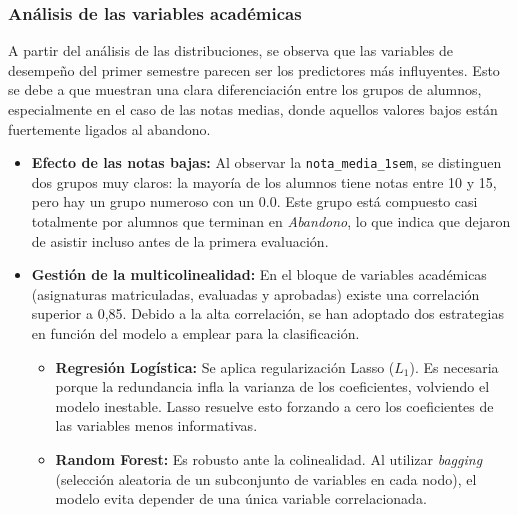\documentclass{article}
\begin{document}
\subsubsection{Análisis de las variables académicas}
A partir del análisis de las distribuciones, se observa que las variables de desempeño del primer semestre parecen ser los predictores más influyentes. Esto se debe a que muestran una clara diferenciación entre los grupos de alumnos, especialmente en el caso de las notas medias, donde aquellos valores bajos están fuertemente ligados al abandono.
\begin{itemize}
    \item \textbf{Efecto de las notas bajas:} Al observar la \texttt{nota\_media\_1sem}, se distinguen dos grupos muy claros: la mayoría de los alumnos tiene notas entre 10 y 15, pero hay un grupo numeroso con un 0.0. Este grupo está compuesto casi totalmente por alumnos que terminan en \textit{Abandono}, lo que indica que dejaron de asistir incluso antes de la primera evaluación.
    \item \textbf{Gestión de la multicolinealidad:} En el bloque de variables académicas (asignaturas matriculadas, evaluadas y aprobadas) existe una correlación superior a 0,85. Debido a la alta correlación, se han adoptado dos estrategias en función del modelo a emplear para la clasificación.
\begin{itemize}
    \item \textbf{Regresión Logística:} Se aplica regularización Lasso ($L_1$). Es necesaria porque la redundancia infla la varianza de los coeficientes, volviendo el modelo inestable. Lasso resuelve esto forzando a cero los coeficientes de las variables menos informativas.
    \item \textbf{Random Forest:} Es robusto ante la colinealidad. Al utilizar \textit{bagging} (selección aleatoria de un subconjunto de variables en cada nodo), el modelo evita depender de una única variable correlacionada.
\end{itemize}
\end{itemize}
\end{document}
